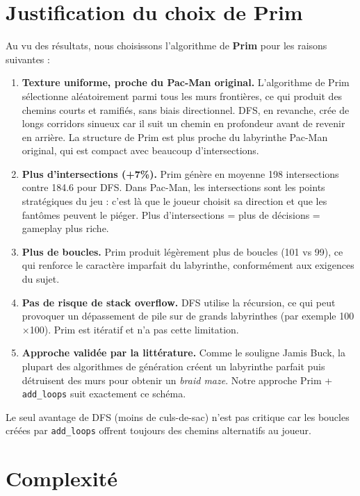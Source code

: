 \documentclass[12pt,a4paper]{article}
\begin{document}
\section{Justification du choix de Prim}

Au vu des résultats, nous choisissons l'algorithme de \textbf{Prim} pour les raisons suivantes :

\begin{enumerate}
    \item \textbf{Texture uniforme, proche du Pac-Man original.} L'algorithme de Prim sélectionne aléatoirement parmi tous les murs frontières, ce qui produit des chemins courts et ramifiés, sans biais directionnel. DFS, en revanche, crée de longs corridors sinueux car il suit un chemin en profondeur avant de revenir en arrière. La structure de Prim est plus proche du labyrinthe Pac-Man original, qui est compact avec beaucoup d'intersections.
    
    \item \textbf{Plus d'intersections (+7\%).} Prim génère en moyenne 198 intersections contre 184.6 pour DFS. Dans Pac-Man, les intersections sont les points stratégiques du jeu : c'est là que le joueur choisit sa direction et que les fantômes peuvent le piéger. Plus d'intersections = plus de décisions = gameplay plus riche.
    
    \item \textbf{Plus de boucles.} Prim produit légèrement plus de boucles (101 vs 99), ce qui renforce le caractère imparfait du labyrinthe, conformément aux exigences du sujet.
    
    \item \textbf{Pas de risque de stack overflow.} DFS utilise la récursion, ce qui peut provoquer un dépassement de pile sur de grands labyrinthes (par exemple 100$\times$100). Prim est itératif et n'a pas cette limitation.
    
    \item \textbf{Approche validée par la littérature.} Comme le souligne Jamis Buck, la plupart des algorithmes de génération créent un labyrinthe parfait puis détruisent des murs pour obtenir un \textit{braid maze}. Notre approche Prim + \texttt{add\_loops} suit exactement ce schéma.
\end{enumerate}

Le seul avantage de DFS (moins de culs-de-sac) n'est pas critique car les boucles créées par \texttt{add\_loops} offrent toujours des chemins alternatifs au joueur.

\section{Complexité}
\end{document}
